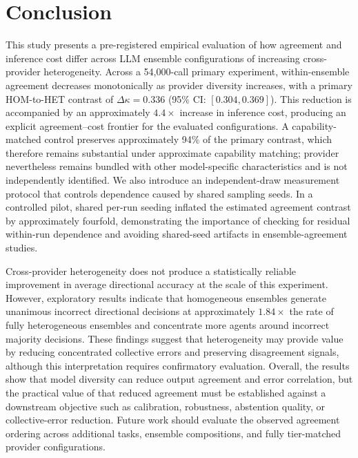 \documentclass{ieeeaccess}
\begin{document}
\section{Conclusion}
This study presents a pre-registered empirical evaluation of how agreement and
inference cost differ across LLM ensemble configurations of increasing
cross-provider heterogeneity. Across a
54{,}000-call primary experiment, within-ensemble agreement decreases
monotonically as provider diversity increases, with a primary HOM-to-HET
contrast of $\Delta\kappa=0.336$ (95\% CI: $[0.304, 0.369]$). This reduction is
accompanied by an approximately $4.4\times$ increase in inference cost,
producing an explicit agreement--cost frontier for the evaluated
configurations. A capability-matched control preserves approximately 94\% of the
primary contrast, which therefore remains substantial under approximate
capability matching; provider nevertheless remains bundled with other
model-specific characteristics and is not independently identified. We
also introduce an independent-draw measurement protocol that controls dependence
caused by shared sampling seeds. In a controlled pilot, shared per-run seeding
inflated the estimated agreement contrast by approximately fourfold,
demonstrating the importance of checking for residual within-run dependence and
avoiding shared-seed artifacts in
ensemble-agreement studies.

Cross-provider heterogeneity does not produce a statistically reliable
improvement in average directional accuracy at the scale of this experiment.
However, exploratory results indicate that homogeneous ensembles generate
unanimous incorrect directional decisions at approximately $1.84\times$ the rate
of fully heterogeneous ensembles and concentrate more agents around incorrect
majority decisions. These findings suggest that heterogeneity may provide value
by reducing concentrated collective errors and preserving disagreement signals,
although this interpretation requires confirmatory evaluation. Overall, the
results show that model diversity can reduce output agreement and error
correlation, but the practical value of that reduced agreement
must be established against a downstream objective such as calibration,
robustness, abstention quality, or collective-error reduction. Future work
should evaluate the observed agreement ordering across additional tasks,
ensemble compositions, and fully tier-matched provider configurations.
\end{document}
